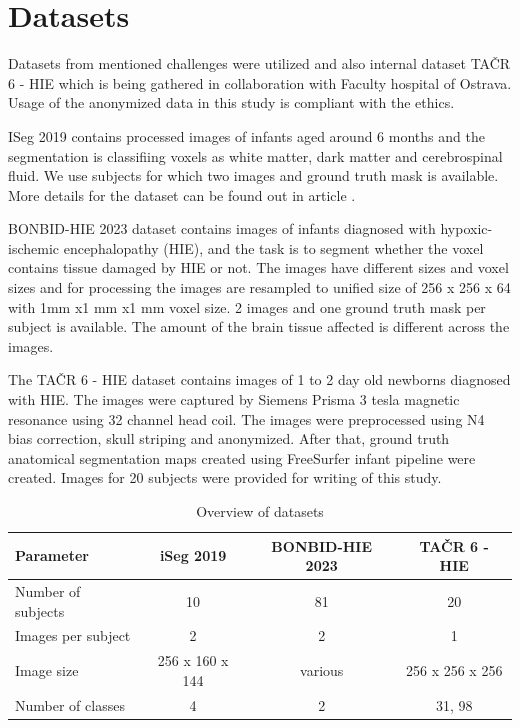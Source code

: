 \documentclass[runningheads]{llncs}
\begin{document}

\section{Datasets}
Datasets from mentioned challenges were utilized and also internal dataset TAČR 6 - HIE which is being gathered in collaboration with Faculty hospital of Ostrava. Usage of the anonymized data in this study is compliant with the ethics. 

ISeg 2019 contains processed images of infants aged around 6 months and the segmentation is classifiing voxels as white matter, dark matter and cerebrospinal fluid. We use subjects for which two images and ground truth mask is available. More details for the dataset can be found out in article \cite{iseg2019}. 

BONBID-HIE 2023 dataset \cite{bonbid} contains images of infants diagnosed with hypoxic-ischemic encephalopathy (HIE), and the task is to segment whether the voxel contains tissue damaged by HIE or not. The images have different sizes and voxel sizes and for processing the images are resampled to unified size of 256 x 256 x 64 with 1mm x1 mm x1 mm voxel size. 2 images and one ground truth mask per subject is available. The amount of the brain tissue affected is different across the images.

The TAČR 6 - HIE dataset contains images of 1 to 2 day old newborns diagnosed with HIE. The images were captured by Siemens Prisma 3 tesla magnetic resonance using 32 channel head coil. The images were preprocessed using N4 bias correction, skull striping and anonymized. After that, ground truth anatomical segmentation maps created using FreeSurfer infant pipeline \cite{freesurfer_infant} were created. Images for 20 subjects were provided for writing of this study.

\begin{table}
\caption{Overview of datasets}
\label{tab:datasetsSummary}
\centering
\begin{tabular}{p{3cm} c c c}
\hline
Parameter & iSeg 2019 & BONBID-HIE 2023 & TAČR 6 - HIE \\
\hline
Number of subjects & 10 & 81 & 20 \\
Images per subject & 2 & 2 & 1 \\
Image size & 256 x 160 x 144 & various & 256 x 256 x 256\\
Number of classes  & 4 & 2 & 31, 98 \\
\hline
\end{tabular}
\end{table}
\end{document}
